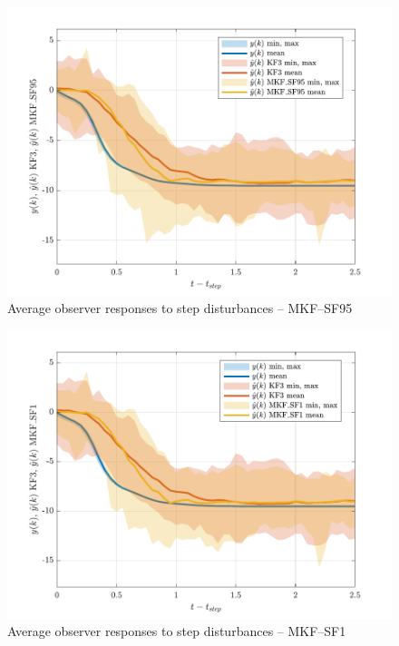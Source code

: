 \begin{figure}[htp]
	\centering
	\includegraphics[width=12cm]{images/grind1_resp_plot_MKF_SF95.pdf}
	\caption{Average observer responses to step disturbances -- MKF--SF95}
	\label{fig:sim_resp_plot_MKF_SF95}
\end{figure}

\begin{figure}[htp]
	\centering
	\includegraphics[width=12cm]{images/grind1_resp_plot_MKF_SF1.pdf}
	\caption{Average observer responses to step disturbances -- MKF--SF1}
	\label{fig:sim_resp_plot_MKF_SF1}
\end{figure}

